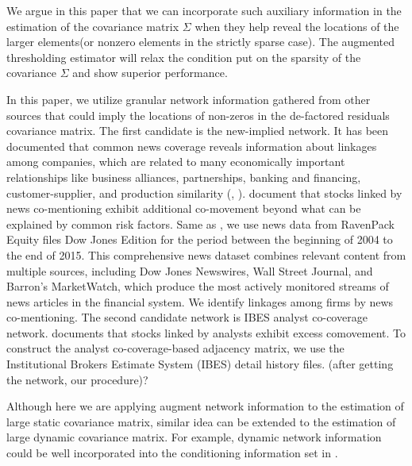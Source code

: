 We argue in this paper that we can incorporate such auxiliary information in the estimation of the covariance matrix \(\Sigma\) when they help reveal the locations of the larger elements(or nonzero elements in the strictly sparse case). The augmented thresholding estimator will relax the condition put on the sparsity of the covariance \(\Sigma\) and show superior performance. 


In this paper, we utilize granular network information gathered from other sources that could imply the locations of non-zeros in the de-factored residuals covariance matrix. The first candidate is the new-implied network. It has been documented that common news coverage reveals information about linkages among companies, which are related to many economically important relationships like business alliances, partnerships, banking and financing, customer-supplier, and production similarity (\cite{scherbina2015economic}, \cite{schwenkler2019network}). \cite{ge2021news} document that stocks linked by news co-mentioning exhibit additional co-movement beyond what can be explained by common risk factors. Same as \cite{ge2021news}, we use news data from RavenPack Equity files Dow Jones Edition for the period between the beginning of 2004 to the end of 2015. This comprehensive news dataset combines relevant content from multiple sources, including Dow Jones Newswires, Wall Street Journal, and Barron’s  MarketWatch, which produce the most actively monitored streams of news articles in the financial system. We identify linkages among firms by news co-mentioning. The second candidate network is IBES analyst co-coverage network. \cite{israelsen2016does} documents that stocks linked by analysts exhibit excess comovement. To construct the analyst co-coverage-based adjacency matrix, we use the Institutional Brokers Estimate System (IBES) detail history files. (after getting the network, our procedure)?


Although here we are applying augment network information to the estimation of large static covariance matrix, similar idea can be extended to the estimation of large dynamic covariance matrix. For example, dynamic network information could be well incorporated into the conditioning information set in \cite{chen2019new}.


